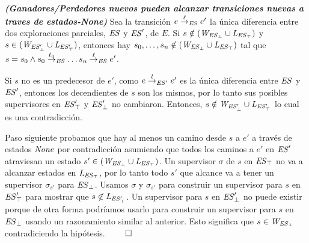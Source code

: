 \begin{lemma}\textbf{\emph{(Ganadores/Perdedores nuevos pueden alcanzar transiciones nuevas a traves de estados-\textit{None})}}
\label{lem:newWinnersLosersAreNonePredecessors}
Sea la transición $e \overset{\ell}{\rightarrow}_{\mathit{ES}} e'$ la única diferencia entre dos exploraciones parciales, $\mathit{ES}$ y $\mathit{ES}'$, de $E$. Si $s \notin (\mathit{W_{\mathit{\mathit{ES}_{\bot}}}} \cup \mathit{L_{\mathit{\mathit{ES}_{\top}}}})$ y $s \in (\mathit{W_{\mathit{\mathit{ES}'_{\bot}}}} \cup \mathit{L_{\mathit{\mathit{ES}'_{\top}}}})$, entonces hay $s_0, \ldots, s_n \notin (\mathit{W_{\mathit{\mathit{ES}_{\bot}}}} \cup \mathit{L_{\mathit{\mathit{ES}_{\top}}}})$ tal que $s = s_0 \wedge
s_0 \overset{\ell_0}{\rightarrow}_{\mathit{ES}}\ldots s_{n} \overset{\ell}{\rightarrow}_{\mathit{ES}} e'$.
\end{lemma}

\begin{Proof Sketch}
Si $s$ 
no es un predecesor de $e'$, como $e \overset{l}{\rightarrow}_{\mathit{ES}'} e'$ es la única diferencia entre $\mathit{ES}$ y $\mathit{ES}'$, entonces los decendientes de $s$ son los mismos, 
por lo tanto sus posibles supervisores en $\mathit{\mathit{ES}'_{\top}}$ y
$\mathit{\mathit{ES}'_{\bot}}$ no cambiaron. Entonces, $s \notin \mathit{W_{\mathit{\mathit{ES}'_{\bot}}}} \cup 
\mathit{L_{\mathit{\mathit{ES}'_{\top}}}}$ lo cual es una contradicción.

Paso siguiente probamos que hay al menos un camino desde $s$ a $e'$ a través de estados $\mathit{None}$ por contradicción asumiendo que todos los caminos a $e'$ en $\mathit{ES}'$ atraviesan un estado $s' \in 
(\mathit{W_{\mathit{\mathit{ES}_{\bot}}}} \cup \mathit{L_{\mathit{\mathit{ES}_{\top}}}})$. Un supervisor $\sigma$ de $s$ en 
$\mathit{\mathit{ES}_{\top}}$ no va a alcanzar estados en $\mathit{L_{\mathit{\mathit{ES}_{\top}}}}$, 
por lo tanto todo $s'$ que alcance va a tener un supervisor $\sigma_{s'}$ para 
$\mathit{\mathit{ES}_{\bot}}$. Usamos $\sigma$ y $\sigma_{s'}$ para construir un supervisor para $s$ en $\mathit{\mathit{ES}'_{\top}}$ para mostrar que $s 
\not\in \mathit{L_{\mathit{\mathit{ES}'_{\top}}}}$.
Un supervisor para $s$ en $\mathit{\mathit{ES}'_{\bot}}$ no puede existir porque de otra forma podríamos usarlo para construir un supervisor para $s$ en 
$\mathit{\mathit{ES}_{\bot}}$ usando un razonamiento similar al anterior. Esto significa que $s \in 
\mathit{W_{\mathit{\mathit{ES}_{\bot}}}}$ contradiciendo la hipótesis. \hfill$\qed$
\end{Proof Sketch}

